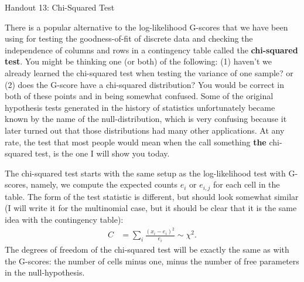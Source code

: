 \documentclass{tufte-handout}
\begin{document}
\justify

{\LARGE Handout 13: Chi-Squared Test}

\vspace*{18pt}

\noindent
There is a popular alternative to the log-likelihood G-scores that we
have been using for testing the goodness-of-fit of discrete data and
checking the independence of columns and rows in a contingency table
called the \textbf{chi-squared test}. You might be thinking one (or
both) of the following: (1) haven't we already learned the chi-squared
test when testing the variance of one sample? or (2) does the G-score
have a chi-squared distribution? You would be correct in both of these
points and in being somewhat confused. Some of the original hypothesis
tests generated in the history of statistics unfortunately became known 
by the name of the null-distribution, which is very confusing because
it later turned out that those distributions had many other applications.
At any rate, the test that most people would mean when the call something
\textbf{the} chi-squared test, is the one I will show you today.

The chi-squared test starts with the same setup as the log-likelihood
test with G-scores, namely, we compute the expected counts $e_i$ or 
$e_{i, j}$ for each cell in the table. The form of the test statistic
is different, but should look somewhat similar (I will write it for
the multinomial case, but it should be clear that it is the same idea
with the contingency table):
\begin{align*}
C &= \sum_i \frac{(x_i - e_i)^2}{e_i} \sim \chi^2.
\end{align*}
The degrees of freedom of the chi-squared test will be exactly the same
as with the G-scores: the number of cells minus one, minus the number of
free parameters in the null-hypothesis. 
\end{document}
